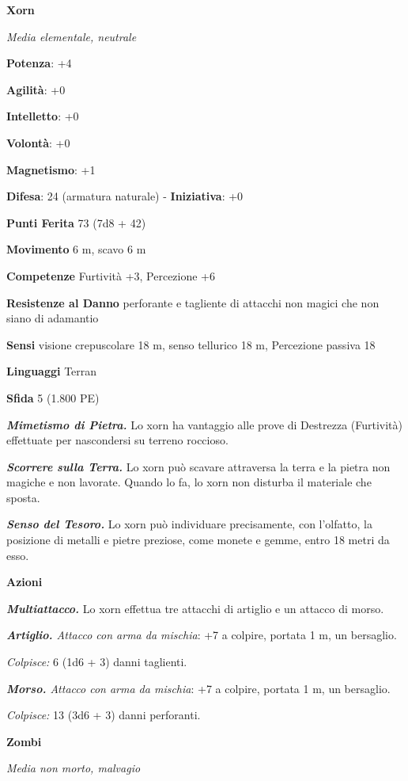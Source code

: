 \begin{multicols}{2}
\textbf{Xorn}

\emph{Media elementale, neutrale}

\textbf{Potenza}: +4

\textbf{Agilità}: +0

\textbf{Intelletto}: +0

\textbf{Volontà}: +0

\textbf{Magnetismo}: +1

\textbf{Difesa}: 24 (armatura naturale) - \textbf{Iniziativa}: +0

\textbf{Punti Ferita} 73 (7d8 + 42)

\textbf{Movimento} 6 m, scavo 6 m

\textbf{Competenze} Furtività +3, Percezione +6

\textbf{Resistenze al Danno} perforante e tagliente di attacchi non
magici che non siano di adamantio

\textbf{Sensi} visione crepuscolare 18 m, senso tellurico 18 m, Percezione
passiva 18

\textbf{Linguaggi} Terran

\textbf{Sfida} 5 (1.800 PE)\smallskip

\emph{\textbf{Mimetismo di Pietra.}} Lo xorn ha vantaggio alle prove di
Destrezza (Furtività) effettuate per nascondersi su terreno roccioso.

\emph{\textbf{Scorrere sulla Terra.}} Lo xorn può scavare attraversa la
terra e la pietra non magiche e non lavorate. Quando lo fa, lo xorn non
disturba il materiale che sposta.

\emph{\textbf{Senso del Tesoro.}} Lo xorn può individuare precisamente,
con l'olfatto, la posizione di metalli e pietre preziose, come monete e
gemme, entro 18 metri da esso.

\smallskip\textbf{Azioni}

\emph{\textbf{Multiattacco.}} Lo xorn effettua tre attacchi di artiglio
e un attacco di morso.

\emph{\textbf{Artiglio.} Attacco con arma da mischia}: +7 a colpire,
portata 1 m, un bersaglio.

\emph{Colpisce:} 6 (1d6 + 3) danni taglienti.

\emph{\textbf{Morso.} Attacco con arma da mischia}: +7 a colpire,
portata 1 m, un bersaglio.

\emph{Colpisce:} 13 (3d6 + 3) danni perforanti.

\textbf{Zombi}

\emph{Media non morto, malvagio}


\end{multicols}
